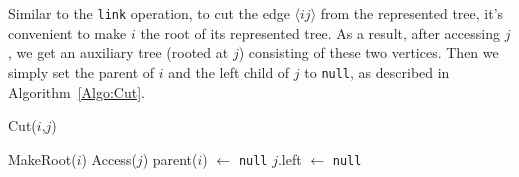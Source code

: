 Similar to the \texttt{link} operation, to cut the edge $\langle ij \rangle$ from the represented tree, it's convenient to make $i$ the root of its represented tree.
As a result, after accessing $j$, we get an auxiliary tree (rooted at $j$) consisting of these two vertices. Then we simply set the parent of $i$ and
the left child of $j$ to \texttt{null}, as described in Algorithm~\ref{Algo:Cut}.

\begin{algorithm}[H]
\SetNoFillComment
\caption{Cut($i$,$j$)} \label{Algo:Cut}
    MakeRoot($i$)\;
    Access($j$)\;
    parent($i$) $\leftarrow$ \texttt{null}\;
    $j$.left $\leftarrow$ \texttt{null}\;
\end{algorithm}
